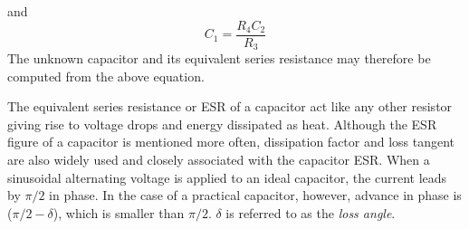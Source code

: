 \documentclass[%
 aip,
 amsmath,amssymb,
 reprint, floatfix%
]{revtex4-1}
\begin{document}
    and
    \begin{equation}
        C_1 = \dfrac{R_4 C_2}{R_3}
    \end{equation}
    The unknown capacitor and its equivalent series resistance may therefore be computed from the above equation.
    \par
    The equivalent series resistance or ESR of a capacitor act like any other resistor giving rise to voltage drops and energy dissipated as heat. Although the ESR figure of a capacitor is mentioned more often, dissipation factor and loss tangent are also widely used and closely associated with the capacitor ESR. When a sinusoidal alternating voltage is applied to an ideal capacitor, the current leads by $\pi/2$ in phase. In the case of a practical capacitor, however, advance in phase is ($\pi/2 - \delta$), which is smaller than $\pi/2$. $\delta$ is referred to as the \textit{loss angle}.
\end{document}
